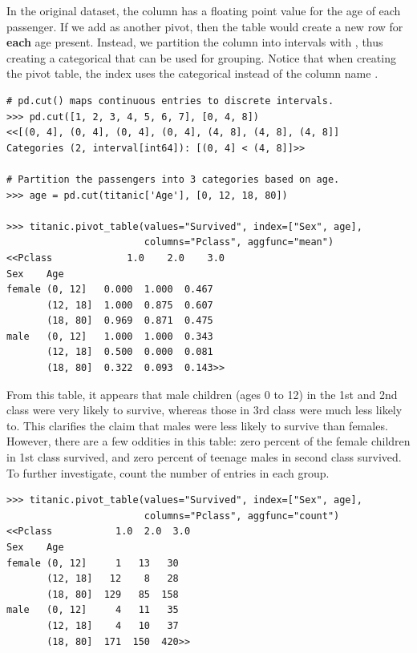 In the original dataset, the  column has a floating point value for the age of each passenger.
If we add  as another pivot, then the table would create a new row for \textbf{each} age present.
Instead, we partition the  column into intervals with , thus creating a categorical that can be used for grouping.
Notice that when creating the pivot table, the index uses the categorical  instead of the column name .


\begin{lstlisting}
# pd.cut() maps continuous entries to discrete intervals.
>>> pd.cut([1, 2, 3, 4, 5, 6, 7], [0, 4, 8])
<<[(0, 4], (0, 4], (0, 4], (0, 4], (4, 8], (4, 8], (4, 8]]
Categories (2, interval[int64]): [(0, 4] < (4, 8]]>>

# Partition the passengers into 3 categories based on age.
>>> age = pd.cut(titanic['Age'], [0, 12, 18, 80])

>>> titanic.pivot_table(values="Survived", index=["Sex", age],
                        columns="Pclass", aggfunc="mean")
<<Pclass             1.0    2.0    3.0
Sex    Age
female (0, 12]   0.000  1.000  0.467
       (12, 18]  1.000  0.875  0.607
       (18, 80]  0.969  0.871  0.475
male   (0, 12]   1.000  1.000  0.343
       (12, 18]  0.500  0.000  0.081
       (18, 80]  0.322  0.093  0.143>>
\end{lstlisting}

From this table, it appears that male children (ages 0 to 12) in the 1st and 2nd class were very likely to survive, whereas those in 3rd class were much less likely to.
This clarifies the claim that males were less likely to survive than females.
However, there are a few oddities in this table: zero percent of the female children in 1st class survived, and zero percent of teenage males in second class survived.
To further investigate, count the number of entries in each group.

%

\begin{lstlisting}
>>> titanic.pivot_table(values="Survived", index=["Sex", age],
                        columns="Pclass", aggfunc="count")
<<Pclass           1.0  2.0  3.0
Sex    Age
female (0, 12]     1   13   30
       (12, 18]   12    8   28
       (18, 80]  129   85  158
male   (0, 12]     4   11   35
       (12, 18]    4   10   37
       (18, 80]  171  150  420>>
\end{lstlisting}

